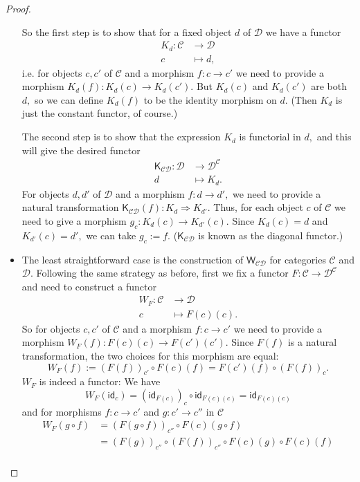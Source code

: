 \documentclass[a4paper]{article}
\theoremstyle{definition}
\theoremstyle{remark}
\newcommand{\C}{\mathcal{C}}
\newcommand{\D}{\mathcal{D}}
\newcommand{\nm}{\mathsf}
\newcommand{\id}{\nm{id}}
\newcommand{\combinator}{\nm}
\newcommand{\constFun}{\combinator{K}}
\newcommand{\dupFun}{\combinator{W}}
\begin{document}
\begin{proof}
\begin{itemize}
    So the first step is to show that for a fixed object $d$ of $\D$ we have a functor
    \begin{align*}
      K_d : \C &\to     \D\\
            c  &\mapsto d,
    \end{align*}
    i.e. for objects $c,c'$ of $\C$ and a morphism $f : c \to c'$ we need to
    provide a morphism $K_d(f) : K_d(c) \to K_d(c').$ But $K_d(c)$ and $K_d(c')$
    are both $d,$ so we can define $K_d(f)$ to be the identity morphism on $d.$ (Then
    $K_d$ is just the constant functor, of course.)

    The second step is to show that the expression $K_d$ is functorial in $d,$ and
    this will give the desired functor
    \begin{align*}
      \constFun_{\C\D} : \D &\to     \D^\C\\
                         d  &\mapsto K_d.
    \end{align*}
    For objects $d,d'$ of $\D$ and a morphism $f : d \to d',$ we need to provide a
    natural transformation $\constFun_{\C\D}(f) : K_d \Rightarrow K_{d'}.$
    Thus, for each object $c$ of $\C$ we need to give a morphism
    $g_c : K_d(c) \to K_{d'}(c).$ Since $K_d(c) = d$ and $K_{d'}(c) = d',$ we can
    take $g_c := f.$ ($\constFun_{\C\D}$ is known as the diagonal functor.)
    \item The least straightforward case is the construction of $\dupFun_{\C\D}$ for
    categories $\C$ and $\D.$ Following the same strategy as before, first we fix a
    functor $F : \C \to \D^\C$ and need to construct a functor
    \begin{align*}
      W_F : \C &\to     \D\\
            c  &\mapsto F(c)(c).
    \end{align*}
    So for objects $c,c'$ of $\C$ and a morphism $f : c \to c'$ we need to provide
    a morphism $W_F(f) : F(c)(c) \to F(c')(c').$ Since $F(f)$ is a natural
    transformation, the two choices for this morphism are equal:
    \[W_F(f) := (F(f))_{c'} \circ F(c)(f) = F(c')(f) \circ (F(f))_c.\]
    $W_F$ is indeed a functor: We have
    \[W_F(\id_c) = (\id_{F(c)})_{c} \circ \id_{F(c)(c)} = \id_{F(c)(c)}\]
    and for morphisms $f : c \to c'$ and $g : c' \to c''$ in $\C$
    \begin{align*}
      W_F(g \circ f) &= (F(g \circ f))_{c''} \circ F(c)(g \circ f)\\
                     &= (F(g))_{c''} \circ (F(f))_{c''} \circ F(c)(g) \circ F(c)(f)\\

\end{align*}
\end{itemize}
\end{proof}
\end{document}
